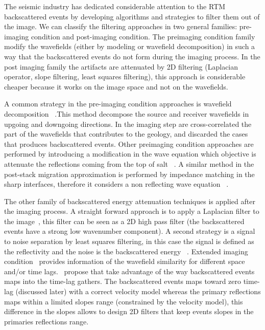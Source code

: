 The seismic industry has dedicated considerable attention to the RTM backscattered events by 
developing algorithms and strategies to filter them out of the image. We can classify the filtering
 approaches in two general families: pre-imaging condition and post-imaging condition. The preimaging
 condition family modify the wavefields (either by modeling or wavefield decomposition)
 in such a way that the backscattered events do not form during the imaging process. In the post
imaging family the artifacts are attenuated by 2D filtering (Laplacian operator, slope filtering, least
squares filtering), this approach is considerable cheaper because it works on the image space and 
not on the wavefields.

A common strategy in the pre-imaging condition approaches is wavefield decomposition
~\citep[]{liu:S29,fei:3130}.This method decompose the source and receiver wavefields in upgoing
and downgoing directions. In the imaging step are cross-correlated the part of the wavefields that
contributes to the geology, and discarded the cases that produces backscattered events. Other preimaging 
condition approaches are performed by introducing a modification in the wave equation
 which objective is attenuate the reflections coming from the top of salt 
~\citep{fletcher:2049}. A similar method in the post-stack migration approximation is performed by impedance matching in
the sharp interfaces, therefore it considers a non reflecting wave equation ~\citep{baysal:132}. 

The other family of backscattered energy attenuation techniques is applied after the imaging process.
 A straight forward approach is to apply a Laplacian filter to the image~\citep{youn:246}, 
this filter can be seen as a 2D high pass filter (the backscattered events have a strong low wavenumber
component). A second strategy is a signal to noise separation by least squares filtering, in
 this case the signal is defined as the reflectivity and the noise is the backscattered energy
~\citep{guitton:S19}. Extended imaging condition~\citep{sava:S209} provides information
 of the wavefield similarity for different space and/or time lags.~\cite{kaelin:3125} propose 
that take advantage of the way backscattered events maps into the time-lag gathers. The backscattered
 events maps toward zero time-lag (discussed later) with a correct velocity model whereas the primary 
reflections maps within a limited slopes range (constrained by the velocity model), this difference in
 the slopes allows to design 2D filters that keep events slopes in the primaries reflections range.

